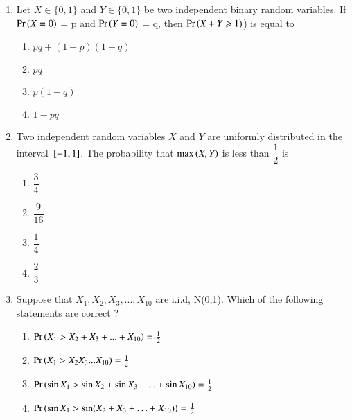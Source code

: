 \renewcommand{\theequation}{\theenumi}
\renewcommand{\thefigure}{\theenumi}
\renewcommand{\thetable}{\theenumi}
\begin{enumerate}[label=\thesection.\arabic*.,ref=\thesection.\theenumi]


\item Let  $X\in \{ 0,1 \}$ and $Y\in \{ 0,1 \}$ be two independent binary random variables. If $\Pr\left(X=0\right)$ = p and  $\Pr\left(Y=0\right)$ = q, then $\Pr\left(X+Y \geqslant 1\right)$) is equal to 
\begin{enumerate}
\item $pq+(1-p)(1-q)$ 
\item  $pq$    
\item $p(1-q)$ 
\item  $1-pq$  
\end{enumerate}
%
\solution
%

%
\item Two independent random variables $X$ and $Y$ are uniformly distributed in the interval ${}\left[-1,1\right]$. The probability that $\max \left(X,Y\right)$ is less than $\dfrac{1}{2}$ is 
\begin{multicols}{4}
\begin{enumerate}
\item $\dfrac{3}{4}$
\item $\dfrac{9}{16}$
\item $\dfrac{1}{4}$
\item $\dfrac{2}{3}$
\end{enumerate}
\end{multicols}
\solution
%

%
\item Suppose that $X_1,X_2,X_3,...,X_{10}$ are i.i.d, N(0,1). Which of the following statements are correct ?
\begin{enumerate}[label = (\Alph*)]
    \item $\Pr\left(X_1>X_2+X_3+...+X_{10}\right)=\frac{1}{2}$
    \item $\Pr\left(X_1>X_2X_3...X_{10}\right)=\frac{1}{2}$
    \item $\Pr\left(\sin{X_1}>\sin{X_2}+\sin{X_3}+...+\sin{X_{10}}\right)=\frac{1}{2}$
    \item $\Pr\left(\sin{X_1}>\sin({X_2+X_3+\ldots+X_{10}})\right)=\frac{1}{2}$
\end{enumerate}
\solution
%



\end{enumerate}
